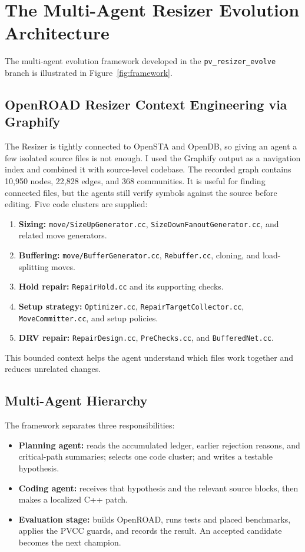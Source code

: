 \documentclass[10pt, conference]{IEEEtran}
\begin{document}
\section{The Multi-Agent Resizer Evolution Architecture}
\label{sec:architecture}

The multi-agent evolution framework developed in the \texttt{pv\_resizer\_evolve} branch is illustrated in Figure~\ref{fig:framework}.

\subsection{OpenROAD Resizer Context Engineering via Graphify}

The Resizer is tightly connected to OpenSTA and OpenDB, so giving an agent a few isolated source files is not enough. I used the Graphify output as a navigation index and combined it with source-level codebase. The recorded graph contains 10{,}950 nodes, 22{,}828 edges, and 368 communities. It is useful for finding connected files, but the agents still verify symbols against the source before editing. Five code clusters are supplied:
\begin{enumerate}
  \item \textbf{Sizing:} \texttt{move/SizeUpGenerator.cc}, \texttt{SizeDownFanoutGenerator.cc}, and related move generators.
  \item \textbf{Buffering:} \texttt{move/BufferGenerator.cc}, \texttt{Rebuffer.cc}, cloning, and load-splitting moves.
  \item \textbf{Hold repair:} \texttt{RepairHold.cc} and its supporting checks.
  \item \textbf{Setup strategy:} \texttt{Optimizer.cc}, \texttt{RepairTargetCollector.cc}, \texttt{MoveCommitter.cc}, and setup policies.
  \item \textbf{DRV repair:} \texttt{RepairDesign.cc}, \texttt{PreChecks.cc}, and \texttt{BufferedNet.cc}.
\end{enumerate}
This bounded context helps the agent understand which files work together and reduces unrelated changes.

\subsection{Multi-Agent Hierarchy}

The framework separates three responsibilities:
\begin{itemize}
  \item \textbf{Planning agent:} reads the accumulated ledger, earlier rejection reasons, and critical-path summaries; selects one code cluster; and writes a testable hypothesis.
  \item \textbf{Coding agent:} receives that hypothesis and the relevant source blocks, then makes a localized C++ patch.
  \item \textbf{Evaluation stage:} builds OpenROAD, runs tests and placed benchmarks, applies the PVCC guards, and records the result. An accepted candidate becomes the next champion.
\end{itemize}
\end{document}
